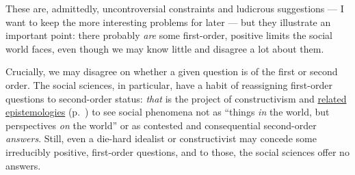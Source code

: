 These are, admittedly, uncontroversial constraints and ludicrous suggestions --- I want to keep the more interesting problems for later --- but they illustrate an important point: there probably \emph{are} some first-order, positive limits the social world faces, even though we may know little and disagree a lot about them.

Crucially, we may disagree on whether a given question is of the first or second order.
The social sciences, in particular, have a habit of reassigning first-order questions to second-order status: \emph{that} is the project of constructivism \citep[for example,][]{Berger1966} and \hyperref[itm:constructivism]{related epistemologies} (p.~\pageref{itm:constructivism}) to see social phenomena not as ``things \emph{in} the world, but perspectives \emph{on} the world'' \citep[174 on ethnicity, emphasis in the original]{Brubaker-2002-aa} or as contested and consequential second-order \emph{answers}.
Still, even a die-hard idealist or constructivist may concede some irreducibly positive, first-order questions, and to those, the social sciences offer no answers.

